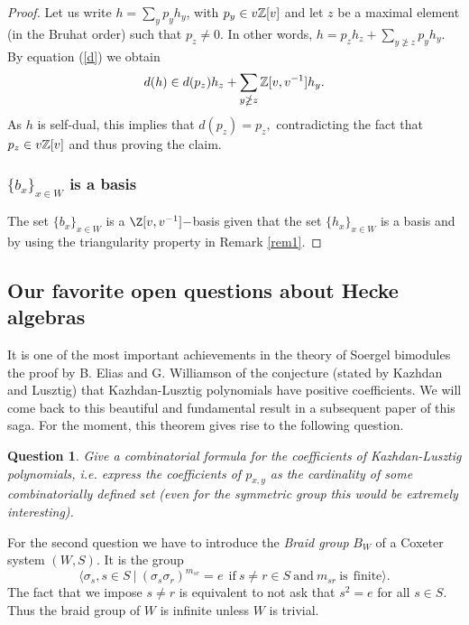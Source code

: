 \documentclass[12pt]{wart}
\newtheorem{ques}[thm]{Question}
\theoremstyle{remark}
\begin{document}
\begin{proof}
Let us write $h=\sum_y p_yh_y$, with $p_y\in v\mathbb Z[v]$ and let $z$ be a maximal element (in the Bruhat order) such that $p_z\neq 0.$ In other words, $h=p_zh_z +\sum_{y\ngeq z} p_yh_y.$ By equation (\ref{d}) we obtain 
$$d(h)\in d(p_z)h_z +\sum_{y\ngeq z}\mathbb Z[v,v^{-1}] h_y.$$ As $h$ is self-dual, this implies that $d(p_z)=p_z,$ contradicting the fact that \newline $p_z\in v\mathbb Z[v]$ and thus proving the claim.  








\subsubsection{ $\{b_x\}_{x\in W}$ is a basis}

The set $\{b_x\}_{x\in W}$ is a $\Z[v,v^{-1}]-$basis given that the set $\{h_x\}_{x\in W}$ is a basis and by using the triangularity property in Remark \ref{rem1}.
\end{proof}


\subsection{Our favorite open questions about Hecke algebras}

It is one of the most important achievements in the theory of Soergel bimodules the proof \cite{EW} by B. Elias and G. Williamson of the conjecture (stated by Kazhdan and Lusztig) that Kazhdan-Lusztig polynomials have positive coefficients. We will come back to this beautiful and fundamental result in a subsequent paper of this saga. For the moment, this theorem gives rise to the following question. 

\begin{ques}Give a combinatorial formula for the coefficients of Kazhdan-Lusztig polynomials, i.e. express the coefficients of $p_{x,y}$ as the cardinality of some combinatorially defined set (even for the symmetric group this would be extremely interesting).
\end{ques}

For the second question we have to introduce the \emph{Braid group} $B_W$ of a Coxeter system $(W,S)$. It is the group $$ \langle \sigma_s, s\in S\ \vert \ (\sigma_s\sigma_r)^{m_{sr}}=e\ \ \mathrm{if}\  s\neq r \in S \ \mathrm{and}\  m_{sr} \ \mathrm{is}\ \ \mathrm{finite} \rangle.$$
The fact that we impose $s\neq r$ is equivalent to not ask that $s^2=e$ for all $s\in S.$ Thus the braid group of $W$ is infinite unless $W$ is trivial. 
\end{document}
